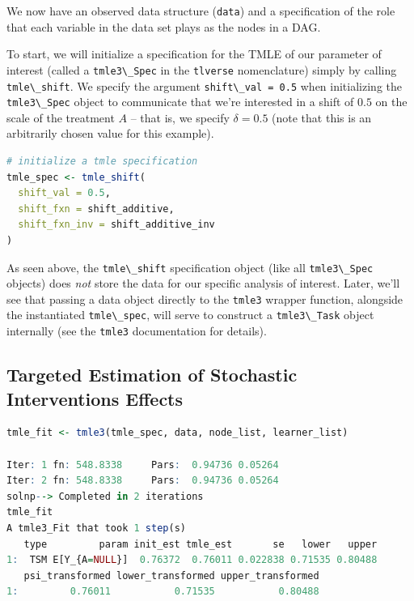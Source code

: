 \documentclass[
  12pt, krantz2,
]{krantz}
\newcommand{\passthrough}[1]{#1}
\theoremstyle{definition}
\theoremstyle{definition}
\theoremstyle{definition}
\newcommand{\1}{\mathbbm{1}}
\begin{document}
We now have an observed data structure (\passthrough{\lstinline!data!}) and a specification of the role
that each variable in the data set plays as the nodes in a DAG.

To start, we will initialize a specification for the TMLE of our parameter of
interest (called a \passthrough{\lstinline!tmle3\_Spec!} in the \passthrough{\lstinline!tlverse!} nomenclature) simply by calling
\passthrough{\lstinline!tmle\_shift!}. We specify the argument \passthrough{\lstinline!shift\_val = 0.5!} when initializing the
\passthrough{\lstinline!tmle3\_Spec!} object to communicate that we're interested in a shift of \(0.5\) on
the scale of the treatment \(A\) -- that is, we specify \(\delta = 0.5\) (note that
this is an arbitrarily chosen value for this example).

\begin{lstlisting}[language=R]
# initialize a tmle specification
tmle_spec <- tmle_shift(
  shift_val = 0.5,
  shift_fxn = shift_additive,
  shift_fxn_inv = shift_additive_inv
)
\end{lstlisting}

As seen above, the \passthrough{\lstinline!tmle\_shift!} specification object (like all \passthrough{\lstinline!tmle3\_Spec!}
objects) does \emph{not} store the data for our specific analysis of interest. Later,
we'll see that passing a data object directly to the \passthrough{\lstinline!tmle3!} wrapper function,
alongside the instantiated \passthrough{\lstinline!tmle\_spec!}, will serve to construct a \passthrough{\lstinline!tmle3\_Task!}
object internally (see the \passthrough{\lstinline!tmle3!} documentation for details).

\hypertarget{targeted-estimation-of-stochastic-interventions-effects}{%
\subsection{Targeted Estimation of Stochastic Interventions Effects}\label{targeted-estimation-of-stochastic-interventions-effects}}

\begin{lstlisting}[language=R]
tmle_fit <- tmle3(tmle_spec, data, node_list, learner_list)

Iter: 1 fn: 548.8338     Pars:  0.94736 0.05264
Iter: 2 fn: 548.8338     Pars:  0.94736 0.05264
solnp--> Completed in 2 iterations
tmle_fit
A tmle3_Fit that took 1 step(s)
   type         param init_est tmle_est       se   lower   upper
1:  TSM E[Y_{A=NULL}]  0.76372  0.76011 0.022838 0.71535 0.80488
   psi_transformed lower_transformed upper_transformed
1:         0.76011           0.71535           0.80488
\end{lstlisting}
\end{document}
